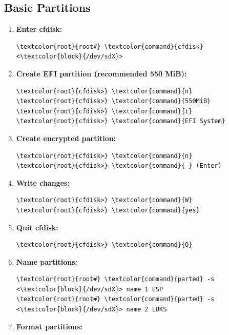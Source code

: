 \documentclass[10pt, a4paper, onecolumn, oneside, titlepage, openany]{book}
\begin{document}
\subsection{Basic Partitions}
\begin{enumerate}
    \item \textbf{Enter cfdisk:}
\begin{Verbatim}[commandchars=\\\{\}]
\textcolor{root}{root#} \textcolor{command}{cfdisk} <\textcolor{block}{/dev/sdX}>
\end{Verbatim}
    \item \textbf{Create EFI partition (recommended 550 MiB):}
\begin{Verbatim}[commandchars=\\\{\}]
\textcolor{root}{cfdisk>} \textcolor{command}{n}
\textcolor{root}{cfdisk>} \textcolor{command}{550MiB}
\textcolor{root}{cfdisk>} \textcolor{command}{t}
\textcolor{root}{cfdisk>} \textcolor{command}{EFI System}
\end{Verbatim}
    \item \textbf{Create encrypted partition:}
\begin{Verbatim}[commandchars=\\\{\}]
\textcolor{root}{cfdisk>} \textcolor{command}{n}
\textcolor{root}{cfdisk>} \textcolor{command}{ } (Enter)
\end{Verbatim}
    \item \textbf{Write changes:}
\begin{Verbatim}[commandchars=\\\{\}]
\textcolor{root}{cfdisk>} \textcolor{command}{W}
\textcolor{root}{cfdisk>} \textcolor{command}{yes}
\end{Verbatim}
    \item \textbf{Quit cfdisk:}
\begin{Verbatim}[commandchars=\\\{\}]
\textcolor{root}{cfdisk>} \textcolor{command}{Q}
\end{Verbatim}
    \item \textbf{Name partitions:}
\begin{Verbatim}[commandchars=\\\{\}]
\textcolor{root}{root#} \textcolor{command}{parted} -s <\textcolor{block}{/dev/sdX}> name 1 ESP
\textcolor{root}{root#} \textcolor{command}{parted} -s <\textcolor{block}{/dev/sdX}> name 2 LUKS
\end{Verbatim}
    \item \textbf{Format partitions:}
    \begin{enumerate}

\end{enumerate}
\end{enumerate}
\end{document}
